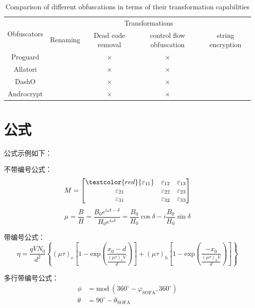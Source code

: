 \begin{table}[htbp]
	\centering
	\caption{Comparison of different obfuscations in terms of their transformation capabilities}
	\begin{tabular}{ccccc} %
		\toprule
		\multirow{2}{*}{Obfuscators} & \multicolumn{4}{c}{Transformations}   \\
		\cline{2-5}  %
		&    Renaming & Dead code removal & control flow obfuscation & string encryption \\
		\midrule
		Proguard &  \checkmark & $\times$  & $\times$ & \checkmark   \\
		Allatori & \checkmark & $\times$  & $\times$ & \checkmark \\
		DashO & \checkmark & $\times$  & $\times$ & \checkmark \\
		Androcrypt & \checkmark & $\times$  & $\times$ & \checkmark  \\
		\bottomrule
	\end{tabular}
	\label{tbl:table1}
\end{table}

\section{公式}
公式示例如下：

不带编号公式：
\[
M=
\left[
\begin{matrix}
	\textcolor{red}{\varepsilon_{11}} & \varepsilon_{12} & \varepsilon_{13}\\
	\varepsilon_{21} & \varepsilon_{22} & \varepsilon_{23}\\
	\varepsilon_{31} & \varepsilon_{32} & \varepsilon_{33}\\
\end{matrix}\right]
\]
\[
\mu = \frac{B}{H}=\frac{B_0 e^{i\omega t-\delta}}{H_0 e^{i\omega t}}=\frac{B_0}{H_0}\cos\delta-i\frac{B_0}{H_0}\sin\delta
\]

带编号公式：
\begin{equation}
	\eta = \frac{qVN_0}{d^2}\left\{(\mu\tau)_e \left[1-\text{exp}\left(\frac{x_0-d}{\frac{(\mu\tau)_e V}{d}}\right)\right]+(\mu\tau)_h \left[1-\text{exp}\left(\frac{-x_0}{\frac{(\mu\tau)_h V}{d}}\right)\right]\right\}
\end{equation}

多行带编号公式：
\begin{align}
	\label{eq:111}
	\phi & = \text{mod}~\left( 360^{\circ}-\varphi_{\text{SOFA}}, 360^{\circ} \right)  \nonumber \\
	\theta & =  90^{\circ} - \theta_{\text{SOFA}} 	
\end{align}


